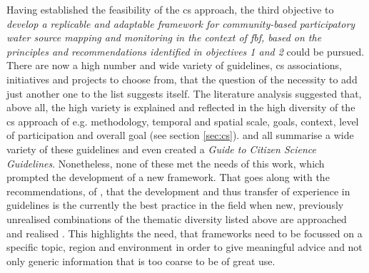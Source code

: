 Having established the feasibility of the \acrshort{cs} approach, the third objective to \textit{develop a replicable and adaptable framework for community-based participatory water source mapping and monitoring in the context of \acrlong{fbf}, based on the principles and recommendations identified in objectives 1 and 2} could be pursued. There are now a high number and wide variety of guidelines, \acrshort{cs} associations, initiatives and projects to choose from, that the question of the necessity to add just another one to the list suggests itself. The literature analysis suggested that, above all, the high variety is explained and reflected in the high diversity of the \acrshort{cs} approach of e.g. methodology, temporal and spatial scale, goals, context, level of participation and overall goal (see section \ref{sec:cs}). \autocite{fraislCitizenScienceEnvironmental2022, westonCommunityBasedWaterMonitoring2015} and \autocite{zhengCrowdsourcingMethodsData2018} all summarise a wide variety of these guidelines and \autocite{garciaFindingWhatYou2021} even created a \textit{Guide to Citizen Science Guidelines}. Nonetheless, none of these met the needs of this work, which prompted the development of a new framework. That goes along with the recommendations, of \autocite{garciaFindingWhatYou2021}, that the development and thus transfer of experience in guidelines is the currently the best practice in the field when new, previously unrealised combinations of the thematic diversity listed above are approached and realised \autocite{garciaFindingWhatYou2021}. This highlights the need, that frameworks need to be focussed on a specific topic, region and environment in order to give meaningful advice and not only generic information that is too coarse to be of great use.\newline
